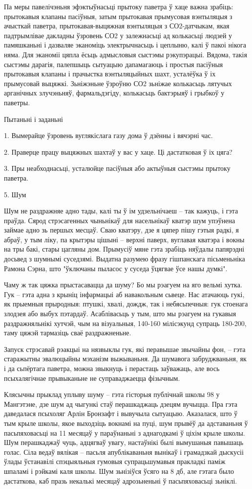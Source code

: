 Па меры павелічэньня эфэктыўнасьці прытоку паветра ў хаце важна зрабіць: прытокавыя клапаны пасіўныя, затым прытокавая прымусовая вэнтыляцыя з ачысткай паветра, прытокавая-выцяжная вэнтыляцыя з СО2-датчыкам, якая падтрымлівае дакладны ўзровень СО2 у залежнасьці ад колькасьці людзей у памяшканьні і дазваляе эканоміць электрычнасьць і цеплыню, калі ў пакоі нікога няма. Для эканоміі цяпла ёсьць адмысловыя сыстэмы рэкупэрацыі. Вядома, такія сыстэмы дарагія, палепшыць сытуацыю дапамагаюць і простыя пасіўныя прытокавыя клапаны і прачыстка вэнтыляцыйных шахт, усталёўка ў іх прымусовай выцяжкі. Зьніжэньне ўзроўню СО2 зьніжае колькасьць лятучых арганічных злучэньняў, фармальдэгіду, колькасьць бактэрыяў і грыбкоў у паветры.

Пытаньні і заданьні

1. Вымерайце ўзровень вуглякіслага газу дома ў дзённы і вячэрні час.

2. Праверце працу выцяжных шахтаў у вас у хаце. Ці дастатковая ў іх цяга?

3. Пры неабходнасьці, усталюйце пасіўныя або актыўныя сыстэмы прытоку паветра.


5. Шум

Шум не раздражняе адно тады, калі ты ў ім удзельнічаеш – так кажуць, і гэта праўда. Сярод стрэсагенных чыньнікаў для насельнікаў кватэр шум упэўнена займае адно зь першых месцаў. Сваю кватэру, дзе я цяпер пішу гэтыя радкі, я абраў, у тым ліку, па крытэры цішыні – верхні паверх, вуглавая кватэра і вокны на тры бакі, стары цагляны дом. Прымусіў мяне гэта зрабіць няўдалы папярэдні досьвед з шумнымі суседзямі. Выдатна разумею фразу гішпанскага пісьменьніка Рамона Сэрна, што "ўключаны пыласос у суседа ўцягвае ўсе нашы думкі".

Чаму ж так цяжка прыстасавацца да шуму? Бо мы рэагуем на яго вельмі хутка. Гук – гэта адна з крыніц інфармацыі аб навакольным сьвеце. Нас атачаюць гукі, як прыемныя прыродныя: птушкі, хвалі, дождж, так і небясьпечныя: гук стоенага злодзея або выбух пэтардаў. Асаблівасьць у тым, што мы рэагуем на гукавыя раздражняльнікі хутчэй, чым на візуальныя, 140-160 мілісэкунд супраць 180-200, таму цяжэй тармазіць сваё раздражненьне.

Запуск стрэсавай рэакцыі на нязвыклы гук, які перавышае звычайны фон, – гэта старажытны эвалюцыйны мэханізм выжываньня. Да шумавога забруджваньня, як і да сьпёртага паветра, можна звыкнуць і перастаць заўважаць, але вось псыхалягічнае прывыканьне не суправаджаецца фізычным.

Клясычны прыклад уплыву шуму – гэта гісторыя публічнай школы 98 у Мангэтэне, дзе шум ад чыгункі стаў перашкаджаць дзецям вучыцца. Пра гэта даведалася псыхоляг Арлін Бронзафт і вывучыла сытуацыю. Аказалася, што ў тым крыле школы, якое выходзіць вокнамі на пуці, шум прывёў да адставаньня ў пасьпяховасьці на 11 месяцаў у параўнаньні з аднагодкамі ў ціхім крыле школы. Шум перашкаджаў чуць, адцягваў увагу, настаўнікі былі вымушаныя павышаць голас. Сіла ведаў вялікая – пасьля апублікаваньня вынікаў і грамадзкай дыскусіі ўлады ўстанавілі спэцыяльныя гумовыя супрацьшумавыя пракладкі паміж шпаламі і рэйкамі каля школы. Шум зьнізіўся ўсяго на 8 дб, але гэтага было дастаткова, каб празь некалькі месяцаў адрозьненьні ў пасьпяховасьці зьніклі.

